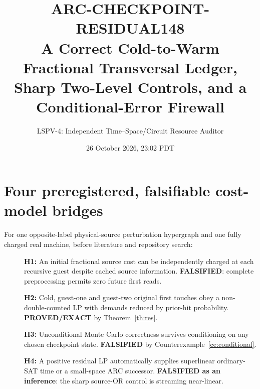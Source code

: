 \documentclass[11pt]{article}
\title{ARC-CHECKPOINT-RESIDUAL148\\
\large A Correct Cold-to-Warm Fractional Transversal Ledger,
Sharp Two-Level Controls, and a Conditional-Error Firewall}
\author{LSPV-4: Independent Time--Space/Circuit Resource Auditor}
\date{26 October 2026, 23:02 PDT}
\begin{document}
\maketitle
\begin{center}
\end{center}

\section{Four preregistered, falsifiable cost-model bridges}
For one opposite-label physical-source perturbation hypergraph and one
fully charged real machine, before literature and repository search:
\begin{description}
\item[] \textbf{H1:} An initial fractional source cost can be independently
charged at each recursive guest despite cached source information.
\textbf{FALSIFIED}: complete preprocessing permits zero future first reads.
\item[] \textbf{H2:} Cold, guest-one and guest-two original first touches
obey a non-double-counted LP with demands reduced by prior-hit probability.
\textbf{PROVED/EXACT} by Theorem~\ref{th:res}.
\item[] \textbf{H3:} Unconditional Monte Carlo correctness survives conditioning
on any chosen checkpoint state. \textbf{FALSIFIED} by
Counterexample~\ref{ce:conditional}.
\item[] \textbf{H4:} A positive residual LP automatically supplies superlinear
ordinary-SAT time or a small-space ARC successor. \textbf{FALSIFIED as an
inference}: the sharp source-OR control is streaming near-linear.
\end{description}
\end{document}
